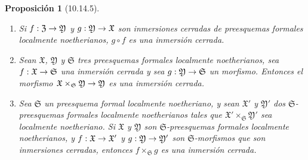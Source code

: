 \documentclass[oneside]{amsart}
\theoremstyle{ega-env-style}
\theoremstyle{ega-thm-env-style}
\newtheorem*{proposition}{Proposición}
\theoremstyle{ega-defn-env-style}
\renewcommand{\to}{\mathchoice{\longrightarrow}{\rightarrow}{\rightarrow}{\rightarrow}}
\newcommand{\oldpage}[2][]{{\marginnote{\normalfont{\textbf{#1}~|~#2}}}\ignorespaces}
\let\EGAOriginalLabel\label
\renewcommand{\label}[1]{\phantomsection\EGAOriginalLabel{#1}}
\begin{document}
\begin{proposition}[10.14.5]
\label{I.10.14.5}
\medskip\noindent
\begin{enumerate}
  \item[\rm{(i)}] Si $f:\mathfrak{Z}\to\mathfrak{Y}$ y $g:\mathfrak{Y}\to\mathfrak{X}$ son inmersiones cerradas de preesquemas formales localmente noetherianos, $g\circ f$ es una inmersión cerrada.
\oldpage[I]{211}
  \item[\rm{(ii)}] Sean $\mathfrak{X}$, $\mathfrak{Y}$ y $\mathfrak{S}$ tres preesquemas formales localmente noetherianos, sea $f:\mathfrak{X}\to\mathfrak{S}$ una inmersión cerrada y sea $g:\mathfrak{Y}\to\mathfrak{S}$ un morfismo.
    Entonces el morfismo $\mathfrak{X}\times_{\mathfrak{S}}\mathfrak{Y}\to\mathfrak{Y}$ es una inmersión cerrada.
  \item[\rm{(iii)}] Sea $\mathfrak{S}$ un preesquema formal localmente noetheriano, y sean $\mathfrak{X}'$ y $\mathfrak{Y}'$ dos $\mathfrak{S}$-preesquemas formales localmente noetherianos tales que $\mathfrak{X}'\times_{\mathfrak{S}}\mathfrak{Y}'$ sea localmente noetheriano.
    Si $\mathfrak{X}$ y $\mathfrak{Y}$ son $\mathfrak{S}$-preesquemas formales localmente noetherianos, y $f:\mathfrak{X}\to\mathfrak{X}'$ y $g:\mathfrak{Y}\to\mathfrak{Y}'$ son $\mathfrak{S}$-morfismos que son inmersiones cerradas, entonces $f\times_{\mathfrak{S}}g$ es una inmersión cerrada.
\end{enumerate}
\end{proposition}
\end{document}
